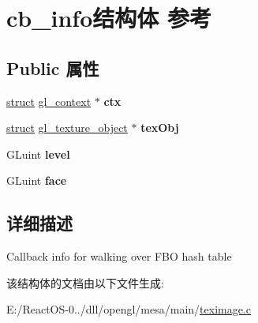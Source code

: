 \hypertarget{structcb__info}{}\section{cb\+\_\+info结构体 参考}
\label{structcb__info}
\subsection*{Public 属性}
\begin{DoxyCompactItemize}
\item 
\mbox{\label{structcb__info_af3116a596c0c1d3a6108e2bebbb06fa3}} 
\hyperlink{interfacestruct}{struct} \hyperlink{structgl__context}{gl\+\_\+context} $\ast$ {\bfseries ctx}
\item 
\mbox{\label{structcb__info_acfc8491aa7b5a2049bac2e5ab736dd3c}} 
\hyperlink{interfacestruct}{struct} \hyperlink{structgl__texture__object}{gl\+\_\+texture\+\_\+object} $\ast$ {\bfseries tex\+Obj}
\item 
\mbox{\label{structcb__info_a8577ae33ab8e827296e9982a03dd1960}} 
G\+Luint {\bfseries level}
\item 
\mbox{\label{structcb__info_a6eaae558a91f122e94b932722927480f}} 
G\+Luint {\bfseries face}
\end{DoxyCompactItemize}


\subsection{详细描述}
Callback info for walking over F\+BO hash table 

该结构体的文档由以下文件生成\+:\begin{DoxyCompactItemize}
\item 
E\+:/\+React\+O\+S-\/0../dll/opengl/mesa/main/\hyperlink{teximage_8c}{teximage.\+c}\end{DoxyCompactItemize}
